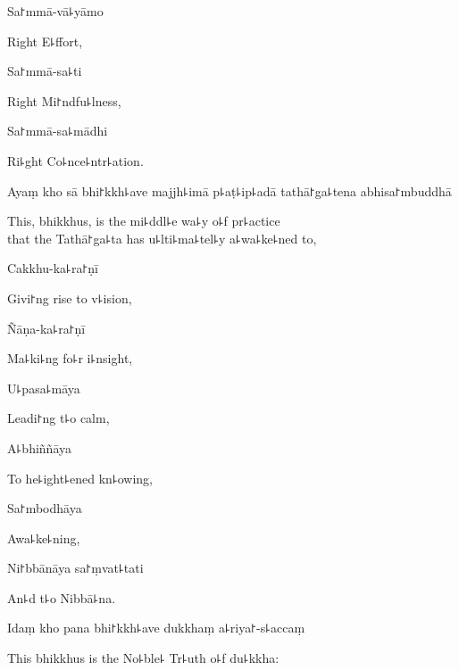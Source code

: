 Sa꜓mmā-vā꜕yāmo

\begin{english}
  Right E꜕ffort,
\end{english}

Sa꜓mmā-sa꜕ti

\begin{english}
  Right Mi꜓ndfu꜕lness,
\end{english}

Sa꜓mmā-sa꜕mādhi

\begin{english}
  Ri꜕ght Co꜕nce꜕ntr꜕ation.
\end{english}

Ayaṃ kho sā bhi꜓kkh꜕ave majjh꜕imā p꜕aṭ꜕ip꜕adā tathā꜓ga꜕tena abhisa꜓mbuddhā

\begin{english}
  This, bhikkhus, is the mi꜕ddl꜕e wa꜕y o꜕f pr꜕actice\\
  that the Tathā꜓ga꜕ta has u꜕lti꜕ma꜕tel꜕y a꜕wa꜕ke꜕ned to,
\end{english}

Cakkhu-ka꜕ra꜓ṇī

\begin{english}
  Givi꜓ng rise to v꜕ision,
\end{english}

Ñāṇa-ka꜕ra꜓ṇī

\begin{english}
  Ma꜕ki꜕ng fo꜕r i꜕nsight,
\end{english}

U꜕pasa꜕māya

\begin{english}
  Leadi꜓ng t꜕o calm,
\end{english}

A꜕bhiññāya

\begin{english}
  To he꜕ight꜕ened kn꜕owing,
\end{english}

Sa꜓mbodhāya

\begin{english}
  Awa꜕ke꜕ning,
\end{english}

Ni꜓bbānāya sa꜓ṃvat꜕tati

\begin{english}
  An꜕d t꜕o Nibbā꜕na.
\end{english}

Idaṃ kho pana bhi꜓kkh꜕ave dukkhaṃ a꜕riya꜓-s꜕accaṃ

\begin{english}
  This bhikkhus is the No꜕ble꜕ Tr꜕uth o꜕f du꜕kkha:
\end{english}

